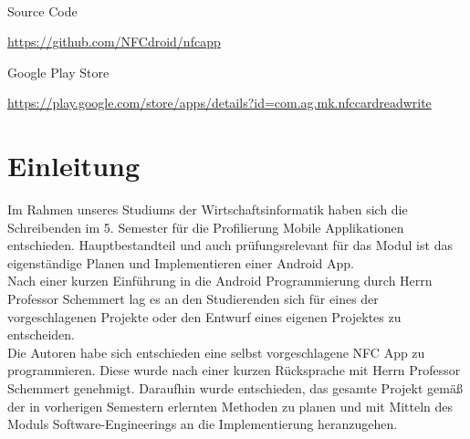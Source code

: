 \documentclass[a4paper,ngerman,12pt]{report}
\begin{document}
\begin{titlepage}
\begin{center}
		\\[2cm]
		\begin{minipage}{0.2\textwidth}
			\begin{flushleft}
				{\footnotesize Source Code}
			\end{flushleft}
		\end{minipage}
		\hfill
		\begin{minipage}{0.75\textwidth}
			\begin{flushleft}
				{\normalsize
				\url{https://github.com/NFCdroid/nfcapp}
				}
			\end{flushleft}
		\end{minipage}
		\begin{minipage}{0.2\textwidth}
			\begin{flushleft}
				{\footnotesize Google Play Store}
			\end{flushleft}
		\end{minipage}
		\hfill
		\begin{minipage}{0.75\textwidth}
			\begin{flushleft}
				{\normalsize
					\url{https://play.google.com/store/apps/details?id=com.ag.mk.nfccardreadwrite}
				}
			\end{flushleft}
		\end{minipage}
		\vfill
	\end{center}
\end{titlepage}

\begingroup
\pagestyle{empty}
\tableofcontents
\clearpage
\endgroup

\chapter{Einleitung}
 Im Rahmen unseres Studiums der Wirtschaftsinformatik haben sich die Schreibenden im 5. Semester für die Profilierung Mobile Applikationen entschieden. Hauptbestandteil und auch prüfungsrelevant für das Modul ist das eigenständige Planen und Implementieren einer Android App. \\
 Nach einer kurzen Einführung in die Android Programmierung durch Herrn Professor Schemmert lag es an den Studierenden sich für eines der vorgeschlagenen Projekte oder den Entwurf eines eigenen Projektes zu entscheiden. \\
 Die Autoren habe sich entschieden eine selbst vorgeschlagene \ac{NFC} App zu programmieren. Diese wurde nach einer kurzen Rücksprache mit Herrn Professor Schemmert genehmigt. \newline
 Daraufhin wurde entschieden, das gesamte Projekt gemäß der in vorherigen Semestern erlernten Methoden zu planen und mit Mitteln des Moduls Software-Engineerings an die Implementierung heranzugehen.
\end{document}
